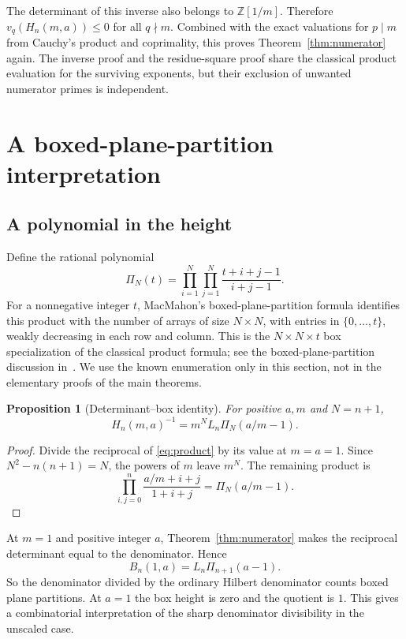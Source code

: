 \documentclass[11pt,a4paper]{article}
\numberwithin{equation}{section}
\newtheorem{proposition}[theorem]{Proposition}
\theoremstyle{definition}
\theoremstyle{remark}
\newcommand{\Z}{\mathbb{Z}}
\newcommand{\PP}{\Pi}
\begin{document}
The determinant of this inverse also belongs to $\Z[1/m]$. Therefore
$v_q(H_n(m,a))\leq0$ for all $q\nmid m$. Combined with the exact valuations for $p\mid m$ from Cauchy's product and coprimality, this proves Theorem~\ref{thm:numerator} again. The inverse proof and the residue-square proof share the classical product evaluation for the surviving exponents, but their exclusion of unwanted numerator primes is independent.

\section{A boxed-plane-partition interpretation}\label{sec:partitions}

\subsection{A polynomial in the height}
Define the rational polynomial
\begin{equation}\label{eq:PP}
 \PP_N(t)=\prod_{i=1}^N\prod_{j=1}^N\frac{t+i+j-1}{i+j-1}.
\end{equation}
For a nonnegative integer $t$, MacMahon's boxed-plane-partition formula identifies this product with the number of arrays of size $N\times N$, with entries in $\{0,\ldots,t\}$, weakly decreasing in each row and column. This is the $N\times N\times t$ box specialization of the classical product formula; see the boxed-plane-partition discussion in~\cite{krattenthaler}. We use the known enumeration only in this section, not in the elementary proofs of the main theorems.

\begin{proposition}[Determinant--box identity]\label{prop:box}
For positive $a,m$ and $N=n+1$,
\begin{equation}\label{eq:boxidentity}
 H_n(m,a)^{-1}=m^N L_n\PP_N(a/m-1).
\end{equation}
\end{proposition}
\begin{proof}
Divide the reciprocal of \eqref{eq:product} by its value at $m=a=1$. Since $N^2-n(n+1)=N$, the powers of $m$ leave $m^N$. The remaining product is
\[
 \prod_{i,j=0}^n\frac{a/m+i+j}{1+i+j}
 =\PP_N(a/m-1).
\]
\end{proof}

At $m=1$ and positive integer $a$, Theorem~\ref{thm:numerator} makes the reciprocal determinant equal to the denominator. Hence
\begin{equation}\label{eq:integeroffsetbox}
 B_n(1,a)=L_n\PP_{n+1}(a-1).
\end{equation}
So the denominator divided by the ordinary Hilbert denominator counts boxed plane partitions. At $a=1$ the box height is zero and the quotient is $1$. This gives a combinatorial interpretation of the sharp denominator divisibility in the unscaled case.
\end{document}
